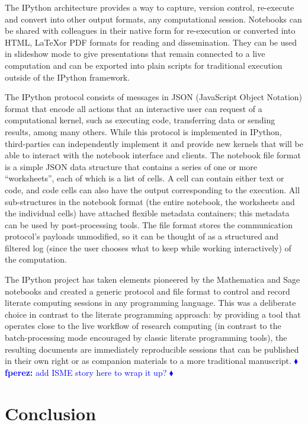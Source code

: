 \documentclass[ChapterTOCs,krantz2]{krantz} %
\newcommand{\fperez}[1] { \textcolor{blue} {
\ensuremath{\blacklozenge} {\bf fperez:}  {#1}
\ensuremath{\blacklozenge} } }
\begin{document}
The IPython architecture provides a way to capture, version control, re-execute
and convert into other output formats, any computational session.  Notebooks
can be shared with colleagues in their native form for re-execution or
converted into HTML, \LaTeX or PDF formats for reading and dissemination.  They
can be used in slideshow mode to give presentations that remain connected to a
live computation and can be exported into plain scripts for traditional
execution outside of the IPython framework.

The IPython protocol consists of messages in JSON (JavaScript Object Notation)
format that encode all actions that an interactive user can request of a
computational kernel, such as executing code, transferring data or sending
results, among many others.  While this protocol is implemented in IPython,
third-parties can independently implement it and provide new kernels that will
be able to interact with the notebook interface and clients.  The notebook file
format is a simple JSON data structure that contains a series of one or more
``worksheets'', each of which is a list of cells.  A cell can contain either
text or code, and code cells can also have the output corresponding to the
execution.  All sub-structures in the notebook format (the entire notebook, the
worksheets and the individual cells) have attached flexible metadata
containers; this metadata can be used by post-processing tools.  The file
format stores the communication protocol's payloads unmodified, so it can be
thought of as a structured and filtered log (since the user chooses what to
keep while working interactively) of the computation.  

The IPython project has taken elements pioneered by the Mathematica and Sage
notebooks and created a generic protocol and file format to control and record
literate computing sessions in any programming language.  This was a deliberate
choice in contrast to the literate programming approach: by providing a tool
that operates close to the live workflow of research computing (in contrast to
the batch-processing mode encouraged by classic literate programming tools),
the resulting documents are immediately reproducible sessions that can be
published in their own right or as companion materials to a more traditional
manuscript.  \fperez{add ISME story here to wrap it up?}


\section{Conclusion}\label{conclusion}
\end{document}
